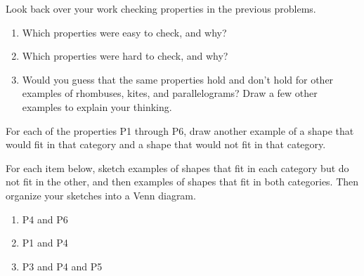 \documentclass[noauthor, nooutcomes]{ximera}
\begin{document}
\begin{problem}
Look back over your work checking properties in the previous problems.
\begin{enumerate}
	\item Which properties were easy to check, and why?
	\item Which properties were hard to check, and why?
	\item Would you guess that the same properties hold and don't hold for other examples of rhombuses, kites, and parallelograms? Draw a few other examples to explain your thinking. 
\end{enumerate}
\end{problem}

\newpage


\begin{problem}
For each of the properties P1 through P6, draw another example of a shape that would fit in that category and a shape that would not fit in that category. 
\end{problem}


\begin{problem}
For each item below, sketch examples of shapes that fit in each category but do not fit in the other, and then examples of shapes that fit in both categories. Then organize your sketches into a Venn diagram.

\begin{enumerate}
	\item P4 and P6
	\item P1 and P4
	\item P3 and P4 and P5
\end{enumerate}
\end{problem}




\newpage
\end{document}
